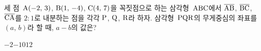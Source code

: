 세 점~$\mathrm{A}(-2,\,3)$, $\mathrm{B}(1,\,-4)$, $\mathrm{C}(4,\,7)$을 꼭짓점으로 하는 삼각형~$\mathrm{ABC}$에서 $\overline{\mathrm{AB}}$, $\overline{\mathrm{BC}}$, $\overline{\mathrm{CA}}$를 $2:1$로 내분하는 점을 각각 $\mathrm{P}$, $\mathrm{Q}$, $\mathrm{R}$라 하자. 삼각형~$\mathrm{PQR}$의 무게중심의 좌표를 $(a,\,b)$라 할 때, $a-b$의 값은?
\begin{choices32}{$-2$}{$-1$}{$0$}{$1$}{$2$}\end{choices32}
